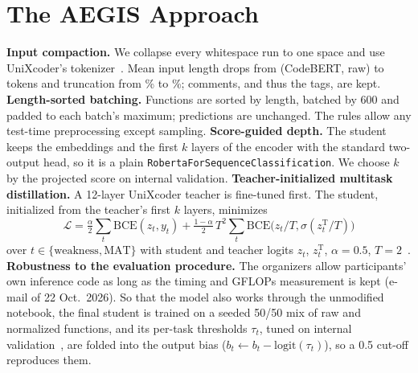 \documentclass[10pt,conference]{IEEEtran}
\begin{document}
\section{The AEGIS Approach}
\label{sec:method}
\textbf{Input compaction.} We collapse every whitespace run to one space and use UniXcoder's
tokenizer~\cite{guo2022unixcoder}. Mean input length drops from \TokRaw{} (CodeBERT, raw) to \TokOurs{} tokens and
truncation from \TruncRaw\% to \TruncOurs\%; comments, and thus the tags, are kept.
\textbf{Length-sorted batching.} Functions are sorted by length, batched by 600 and padded to each batch's
maximum; predictions are unchanged. The rules allow any test-time preprocessing except sampling.
\textbf{Score-guided depth.} The student keeps the embeddings and the first $k$ layers of the encoder with the
standard two-output head, so it is a plain \texttt{RobertaForSequenceClassification}. We choose $k$ by the
projected score on internal validation.
\textbf{Teacher-initialized multitask distillation.} A 12-layer UniXcoder teacher is fine-tuned first. The student,
initialized from the teacher's first $k$ layers, minimizes
\begin{equation}
\mathcal{L} = \tfrac{\alpha}{2}\sum_{t} \mathrm{BCE}(z_t, y_t)
 + \tfrac{1-\alpha}{2}\,T^2 \sum_{t} \mathrm{BCE}\big(z_t/T, \sigma(z^{\mathrm{T}}_t/T)\big)
\end{equation}
over $t\in\{\text{weakness},\text{MAT}\}$ with student and teacher logits $z_t$, $z^{\mathrm{T}}_t$, $\alpha=0.5$,
$T=2$~\cite{hinton2015distilling}.
\textbf{Robustness to the evaluation procedure.} The organizers allow participants' own inference code as long as
the timing and GFLOPs measurement is kept (e-mail of 22 Oct.\ 2026). So that the model also works through the
unmodified notebook, the final student is trained on a seeded 50/50 mix of raw and normalized functions, and its per-task
thresholds $\tau_t$, tuned on internal validation~\cite{lipton2014f1}, are folded into the output bias
($b_t \leftarrow b_t - \mathrm{logit}(\tau_t)$), so a 0.5 cut-off reproduces them.
\end{document}
